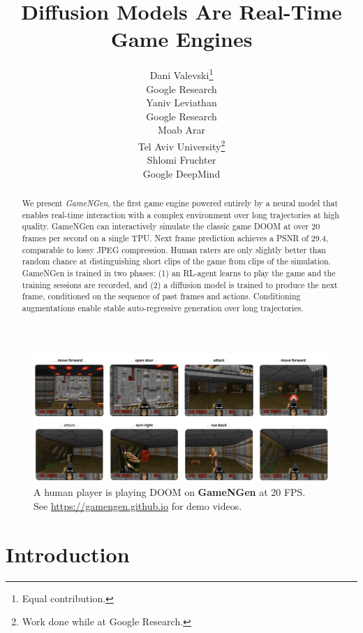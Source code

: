 \documentclass{article} %
\title{Diffusion Models Are Real-Time Game Engines}
\author{Dani Valevski\thanks{Equal contribution.} \\
Google Research \\
\And
Yaniv Leviathan\footnotemark[1] \\
Google Research \\
\And
Moab Arar\footnotemark[1] \\
Tel Aviv University\thanks{Work done while at Google Research.} \\
\And
Shlomi Fruchter\footnotemark[1] \\
Google DeepMind \\
}
\begin{document}
\maketitle


\begin{abstract}
\vspace{-0.05in}
We present \emph{GameNGen}, the first game engine powered entirely by a neural model
that enables real-time interaction with a complex environment over long trajectories at high quality.
GameNGen can interactively simulate the classic game DOOM at over 20 frames per second on a single TPU.
Next frame prediction achieves a PSNR of 29.4, comparable to lossy JPEG compression.
Human raters are only slightly better than random chance at distinguishing short clips of the game from clips of the simulation.
GameNGen is trained in two phases: (1) an RL-agent learns to play the game and the training sessions are recorded, and
(2) a diffusion model is trained to produce the next frame, conditioned on the sequence of past frames and actions.
Conditioning augmentations enable stable auto-regressive generation over long trajectories.
\end{abstract}


\begin{figure}[ht]
    \centering
    \vspace{-0.1in}
    \includegraphics[width=\textwidth]{figures/teaser.png}
    \caption{
    A human player is playing DOOM on \textbf{GameNGen} at 20 FPS.\\
    See \url{https://gamengen.github.io} for demo videos.}
    \label{fig:teaser}
    \vspace{-0.05in}
\end{figure}


\section{Introduction}
\end{document}
